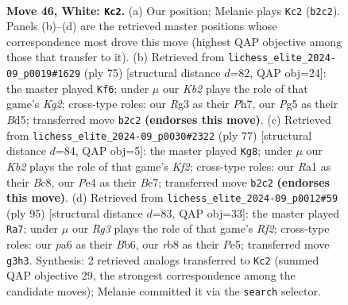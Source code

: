\documentclass[11pt]{article}
\begin{document}
\clearpage

\begin{figure}[p]\centering
\begin{subfigure}{0.46\textwidth}\centering
\resizebox{\linewidth}{!}{%
\newchessgame
\chessboard[
  setfen={1rr2b2/7p/p2p2k1/P1n1p1Pp/1pP1P3/1P3PR1/1K4B1/R3B3 w - - 6 46},
  showmover=false,
  pgfstyle=straightmove, color=movearrow, markmove={b2-c2}
]}
\caption{}
\end{subfigure}\hfill
\begin{subfigure}{0.46\textwidth}\centering
\resizebox{\linewidth}{!}{%
\newchessgame
\chessboard[
  setfen={6r1/1r4kp/2p1p3/p2b1p2/P1pP1N2/1nP3PB/R6P/5RK1 b - - 0 38},
  showmover=false,
  pgfstyle=straightmove, color=movearrow, markmove={g7-f6}
]}
\caption{}
\end{subfigure}
\\[4pt]
\begin{subfigure}{0.46\textwidth}\centering
\resizebox{\linewidth}{!}{%
\newchessgame
\chessboard[
  setfen={2b5/2prbkp1/1pp5/p6r/P4R1p/1PP2N1P/5BPK/4R3 b - - 0 39},
  showmover=false,
  pgfstyle=straightmove, color=movearrow, markmove={f7-g8}
]}
\caption{}
\end{subfigure}\hfill
\begin{subfigure}{0.46\textwidth}\centering
\resizebox{\linewidth}{!}{%
\newchessgame
\chessboard[
  setfen={8/5rpk/1bp2p2/p3pPp1/1r2P3/1PRP2KP/R3N1P1/8 b - - 1 48},
  showmover=false,
  pgfstyle=straightmove, color=movearrow, markmove={f7-a7}
]}
\caption{}
\end{subfigure}
\caption{\textbf{Move 46, White: \texttt{Kc2}.} (a) Our position; Melanie plays \texttt{Kc2} (\texttt{b2c2}). Panels (b)--(d) are the retrieved master positions whose correspondence most drove this move (highest QAP objective among those that transfer to it). (b) Retrieved from \texttt{lichess\_elite\_2024-09\_p0019\#1629} (ply 75) [structural distance $d$=82, QAP obj=24]: the master played \texttt{Kf6}; under $\mu$ our \emph{Kb2} plays the role of that game's \emph{Kg2}; cross-type roles: our \emph{R}g3 as their \emph{P}h7, our \emph{P}g5 as their \emph{B}d5; transferred move \texttt{b2c2} \textbf{(endorses this move)}. (c) Retrieved from \texttt{lichess\_elite\_2024-09\_p0030\#2322} (ply 77) [structural distance $d$=84, QAP obj=5]: the master played \texttt{Kg8}; under $\mu$ our \emph{Kb2} plays the role of that game's \emph{Kf2}; cross-type roles: our \emph{R}a1 as their \emph{B}c8, our \emph{P}e4 as their \emph{B}e7; transferred move \texttt{b2c2} \textbf{(endorses this move)}. (d) Retrieved from \texttt{lichess\_elite\_2024-09\_p0012\#59} (ply 95) [structural distance $d$=83, QAP obj=33]: the master played \texttt{Ra7}; under $\mu$ our \emph{Rg3} plays the role of that game's \emph{Rf2}; cross-type roles: our \emph{p}a6 as their \emph{B}b6, our \emph{r}b8 as their \emph{P}e5; transferred move \texttt{g3h3}. Synthesis: 2 retrieved analogs transferred to \texttt{Kc2} (summed QAP objective 29, the strongest correspondence among the candidate moves); Melanie committed it via the \texttt{search} selector.}
\label{fig:thought-m90}
\end{figure}
\end{document}
